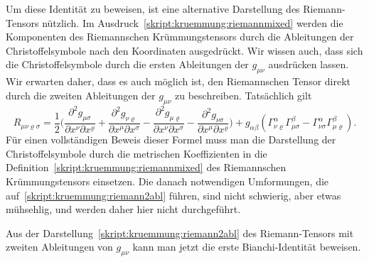 Um diese Identität zu beweisen, ist eine alternative Darstellung des
Riemann-Tensors nützlich. 
Im Ausdruck~\eqref{skript:kruemmung:riemannmixed} werden die Komponenten
des Riemannschen Krümmungstensors durch die Ableitungen der Christoffelsymbole
nach den Koordinaten ausgedrückt.
Wir wissen auch, dass sich die Christoffelsymbole durch die ersten Ableitungen
der $g_{\mu\nu}$ ausdrücken lassen.
Wir erwarten daher, dass es auch möglich ist, den Riemannschen Tensor direkt
durch die zweiten Ableitungen der $g_{\mu\nu}$ zu beschreiben.
Tatsächlich gilt
\begin{equation}
R_{\mu\nu\varrho\sigma}
=
\frac12\biggl(
\frac{\partial^2 g_{\mu\sigma}}{\partial x^\nu\partial x^\varrho}
+
\frac{\partial^2 g_{\nu\varrho}}{\partial x^\mu\partial x^\sigma}
-
\frac{\partial^2 g_{\mu\varrho}}{\partial x^\nu\partial x^\sigma}
-
\frac{\partial^2 g_{\nu\sigma}}{\partial x^\mu\partial x^\varrho}
\biggr)
+g_{\alpha\beta}(
\Gamma^\alpha_{\nu\varrho}\Gamma^\beta_{\mu\sigma}
- \Gamma^\alpha_{\nu\sigma}\Gamma^\beta_{\mu\varrho}
).
\label{skript:kruemmung:riemann2abl}
\end{equation}
Für einen vollständigen Beweis dieser Formel muss man die Darstellung
der Christoffelsymbole durch die metrischen Koeffizienten in die
Definition~\eqref{skript:kruemmung:riemannmixed} des Riemannschen
Krümmungstensors einsetzen.
Die danach notwendigen Umformungen, die
auf~\eqref{skript:kruemmung:riemann2abl} führen,
sind nicht schwierig, aber etwas mühsehlig, und werden daher hier
nicht durchgeführt.

Aus der Darstellung~\eqref{skript:kruemmung:riemann2abl} des Riemann-Tensors
mit zweiten Ableitungen von $g_{\mu\nu}$ kann man jetzt die erste
Bianchi-Identität beweisen.

